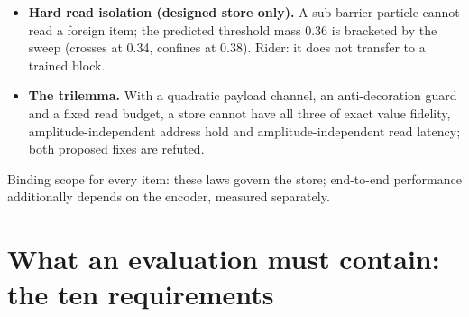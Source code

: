 \documentclass{article} %
\newcommand{\sci}[2]{\ensuremath{#1\times10^{#2}}}
\begin{document}
\begin{itemize}[leftmargin=*,itemsep=1pt]
  matches stored-activation gradients to \sci{2.1}{-6} relative in float32, with peak activation
  memory 6.3 KB against 6.00 MB at $T=1024$; exact only at zero damping. %
\item \textbf{Hard read isolation (designed store only).} A sub-barrier particle cannot read a
  foreign item; the predicted threshold mass 0.36 is bracketed by the sweep (crosses at 0.34,
  confines at 0.38). Rider: it does not transfer to a trained block. %
\item \textbf{The trilemma.} With a quadratic payload channel, an anti-decoration guard and a fixed
  read budget, a store cannot have all three of exact value fidelity, amplitude-independent address
  hold and amplitude-independent read latency; both proposed fixes are refuted.
\end{itemize}
Binding scope for every item: these laws govern the store; end-to-end performance additionally
depends on the encoder, measured separately. %

\section{What an evaluation must contain: the ten requirements}
\label{app:bench}
\end{document}
